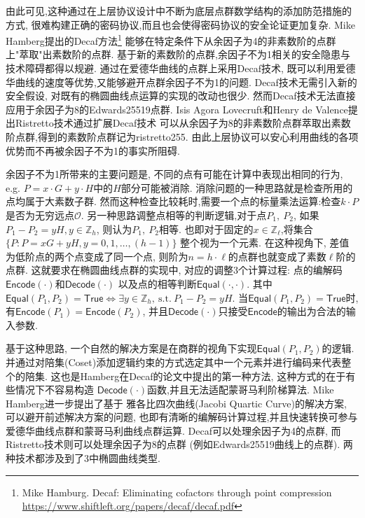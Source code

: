 \documentclass{article}
\newcommand{\Z}{\mathbb{Z}}
\newcommand{\Encode}{\textsf{Encode}}
\newcommand{\Decode}{\textsf{Decode}}
\newcommand{\Equal}{\textsf{Equal}}
\newcommand{\True}{\textsf{True}}
\begin{document}
由此可见,这种通过在上层协议设计中不断为底层点群数学结构的添加防范措施的方式,
很难构建正确的密码协议,而且也会使得密码协议的安全论证更加复杂.
Mike Hamberg提出的Decaf方法\footnote{
Mike Hamburg. Decaf: Eliminating cofactors through point compression \\
\phantom{xxxx}\url{https://www.shiftleft.org/papers/decaf/decaf.pdf}}
能够在特定条件下从余因子为4的非素数阶的点群上"萃取"出素数阶的点群.
基于新的素数阶的点群,余因子不为1相关的安全隐患与技术障碍都得以规避.
通过在爱德华曲线的点群上采用Decaf技术,
既可以利用爱德华曲线的速度等优势,又能够避开点群余因子不为1的问题.
Decaf技术无需引入新的安全假设, 对既有的椭圆曲线点运算的实现的改动也很少.
然而Decaf技术无法直接应用于余因子为8的Edwards25519点群.
Isis Agora Lovecruft和Henry de Valence提出Ristretto技术通过扩展Decaf技术
可以从余因子为8的非素数阶点群萃取出素数阶点群,得到的素数阶点群记为ristretto255.
由此上层协议可以安心利用曲线的各项优势而不再被余因子不为1的事实所阻碍.

余因子不为1所带来的主要问题是, 不同的点有可能在计算中表现出相同的行为, 
e.g. $P = x\cdot G + y \cdot H$中的$H$部分可能被消除. 
消除问题的一种思路就是检查所用的点均属于大素数子群.
然而这种检查比较耗时,需要一个点的标量乘法运算:检查$k\cdot P$是否为无穷远点$\mathcal{O}$.
另一种思路调整点相等的判断逻辑,对于点$P_1,~P_2$, 如果$P_1 - P_2 = yH, y \in \Z_h$, 
则认为$P_1,~P_2$相等. 也即对于固定的$x\in\Z_\ell$,将集合$\{P: P = xG + yH,  y = 0, 1, \ldots, (h-1)\}$
整个视为一个元素. 在这种视角下, 差值为低阶点的两个点变成了同一个点, 
则阶为$n = h\cdot\ell$的点群也就变成了素数$\ell$阶的点群. 
这就要求在椭圆曲线点群的实现中, 对应的调整3个计算过程: 
点的编解码$\Encode(\cdot)$和$\Decode(\cdot)$
以及点的相等判断$\Equal(\cdot, \cdot)$. 
其中$\Equal(P_1, P_2) = \True \iff \exists y \in \Z_h,~\text{s.t.}~P_1 - P_2 = yH$.
当$\Equal(P_1, P_2) = \True$时, 有$\Encode(P_1) = \Encode(P_2)$, 
并且$\Decode(\cdot)$只接受$\Encode$的输出为合法的输入参数.

基于这种思路, 一个自然的解决方案是在商群的视角下实现$\Equal(P_1, P_2)$的逻辑.
并通过对陪集(Coset)添加逻辑约束的方式选定其中一个元素并进行编码来代表整个的陪集.
这也是Hamberg在Decaf的论文中提出的第一种方法, 这种方式的在于有些情况下不容易构造
$\Decode(\cdot)$函数,并且无法适配蒙哥马利阶梯算法. Mike Hamberg进一步提出了基于
雅各比四次曲线(Jacobi Quartic Curve)的解决方案, 可以避开前述解决方案的问题,
也即有清晰的编解码计算过程,并且快速转换可参与爱德华曲线点群和蒙哥马利曲线点群运算.
Decaf可以处理余因子为4的点群, 而Ristretto技术则可以处理余因子为8的点群
(例如Edwards25519曲线上的点群). 两种技术都涉及到了3中椭圆曲线类型.
\end{document}
